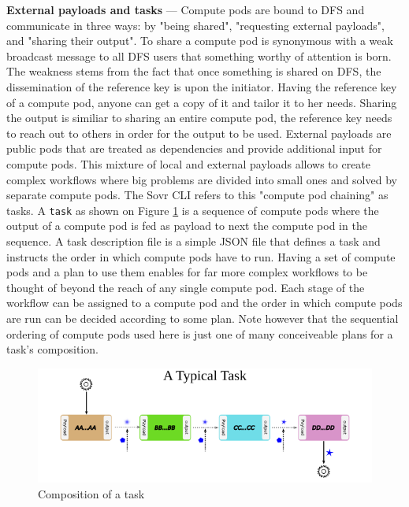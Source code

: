 \documentclass[a4paper, 10pt]{article}
\begin{document}
\par
\textbf{External payloads and tasks} --- Compute pods are bound to DFS and communicate in three ways: by "being shared", "requesting external payloads", and "sharing their output". To share a compute pod is synonymous with a weak broadcast message to all DFS users that something worthy of attention is born. The weakness stems from the fact that once something is shared on DFS, the dissemination of the reference key is upon the initiator. Having the reference key of a compute pod, anyone can get a copy of it and tailor it to her needs. Sharing the output is similiar to sharing an entire compute pod, the reference key needs to reach out to others in order for the output to be used. External payloads are public pods that are treated as dependencies and provide additional input for compute pods. This mixture of local and external payloads allows to create complex workflows where big problems are divided into small ones and solved by separate compute pods. The Sovr CLI refers to this "compute pod chaining" as tasks. A \texttt{task} as shown on Figure  \ref{task} is a sequence of compute pods where the output of a compute pod is fed as payload to next the compute pod in the sequence. A task description file is a simple JSON file that defines a task and instructs the order in which compute pods have to run. Having a set of compute pods and a plan to use them enables for far more complex workflows to be thought of beyond the reach of any single compute pod. Each stage of the workflow can be assigned to a compute pod and the order in which compute pods are run can be decided according to some plan. Note however that the sequential ordering of compute pods used here is just one of many conceiveable plans for a task's composition.
\begin{figure}
\includegraphics[scale=0.7,keepaspectratio=true]{images/task.png}
\caption{\label{task}Composition of a task}
\end{figure}
\par
\end{document}
